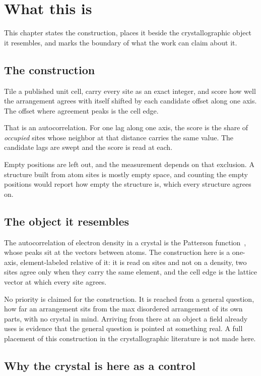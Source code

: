 \chapter{What this is}

This chapter states the construction, places it beside the crystallographic object it resembles, and marks the boundary of what the work can claim about it.

\section{The construction}

Tile a published unit cell, carry every site as an exact integer, and score how well the arrangement agrees with itself shifted by each candidate offset along one axis. The offset where agreement peaks is the cell edge.

That is an autocorrelation. For one lag along one axis, the score is the share of \emph{occupied} sites whose neighbor at that distance carries the same value. The candidate lags are swept and the score is read at each.

Empty positions are left out, and the measurement depends on that exclusion. A structure built from atom sites is mostly empty space, and counting the empty positions would report how empty the structure is, which every structure agrees on.

\section{The object it resembles}

The autocorrelation of electron density in a crystal is the Patterson function~\cite{src:Patterson-1934}, whose peaks sit at the vectors between atoms. The construction here is a one-axis, element-labeled relative of it: it is read on sites and not on a density, two sites agree only when they carry the same element, and the cell edge is the lattice vector at which every site agrees.

No priority is claimed for the construction. It is reached from a general question, how far an arrangement sits from the max disordered arrangement of its own parts, with no crystal in mind. Arriving from there at an object a field already uses is evidence that the general question is pointed at something real. A full placement of this construction in the crystallographic literature is not made here.

\section{Why the crystal is here as a control}


